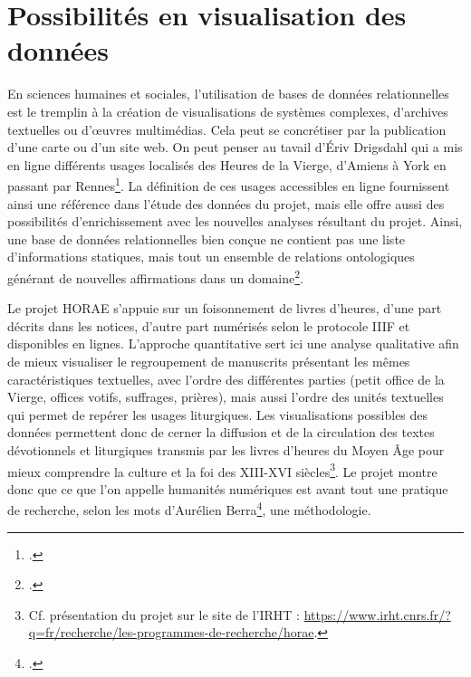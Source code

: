 \documentclass[a4paper,12pt,twoside]{book}
\begin{document}
	\section{Possibilités en visualisation des données}

	En sciences humaines et sociales, l'utilisation de bases de données relationnelles est le tremplin à la création de visualisations de systèmes complexes, d'archives textuelles ou d'œuvres multimédias. Cela peut se concrétiser par la publication d'une carte ou d'un site web. On peut penser au tavail d'Ériv Drigsdahl qui a mis en ligne différents usages localisés des Heures de la Vierge, d'Amiens à York en passant par Rennes\footcite{Usages_HVierge}. La définition de ces usages accessibles en ligne fournissent ainsi une référence dans l'étude des données du projet, mais elle offre aussi des possibilités d'enrichissement avec les nouvelles analyses résultant du projet. Ainsi, une base de données relationnelles bien conçue ne contient pas une liste d'informations statiques, mais tout un ensemble de relations ontologiques générant de nouvelles affirmations dans un domaine\footcite[Partie II, Chapitre 15]{Compagnon_DH}. 
	
	Le projet HORAE s'appuie sur un foisonnement de livres d'heures, d'une part décrits dans les notices, d'autre part numérisés selon le protocole IIIF et disponibles en lignes. L'approche quantitative sert ici une analyse qualitative afin de mieux visualiser le regroupement de manuscrits présentant les mêmes caractéristiques textuelles, avec l’ordre des différentes parties (petit office de la Vierge, offices votifs, suffrages, prières), mais aussi l’ordre des unités textuelles qui permet de repérer les usages liturgiques. Les visualisations possibles des données permettent donc de cerner la diffusion et de la circulation des textes dévotionnels et liturgiques transmis par les livres d’heures du Moyen Âge pour mieux comprendre la culture et la foi des \textsc{XIII}-\textsc{XVI} siècles\footnote{Cf. présentation du projet sur le site de l'IRHT : \url{https://www.irht.cnrs.fr/?q=fr/recherche/les-programmes-de-recherche/horae}.}. Le projet montre donc que ce que l'on appelle humanités numériques est avant tout une \og pratique de recherche\fg{}, selon les mots d'Aurélien Berra\footcite{Faire_HN}, une méthodologie.
	
\end{document}
